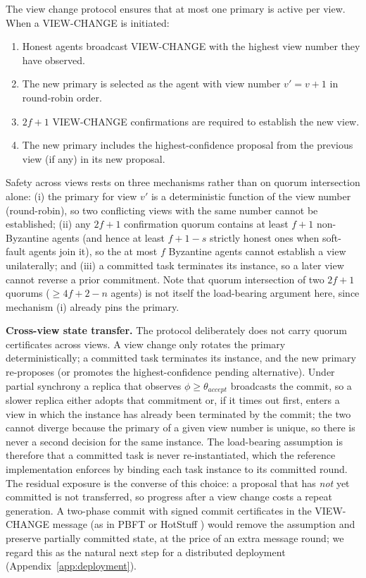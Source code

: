 \documentclass{article}
\begin{document}
The view change protocol ensures that at most one primary is active per view. When a VIEW-CHANGE is initiated:
\begin{enumerate}
    \item Honest agents broadcast VIEW-CHANGE with the highest view number they have observed.
    \item The new primary is selected as the agent with view number $v' = v + 1$ in round-robin order.
    \item $2f + 1$ VIEW-CHANGE confirmations are required to establish the new view.
    \item The new primary includes the highest-confidence proposal from the previous view (if any) in its new proposal.
\end{enumerate}
Safety across views rests on three mechanisms rather than on quorum intersection alone: (i) the primary for view $v'$ is a deterministic function of the view number (round-robin), so two conflicting views with the same number cannot be established; (ii) any $2f+1$ confirmation quorum contains at least $f+1$ non-Byzantine agents (and hence at least $f{+}1{-}s$ strictly honest ones when soft-fault agents join it), so the at most $f$ Byzantine agents cannot establish a view unilaterally; and (iii) a committed task terminates its instance, so a later view cannot reverse a prior commitment. Note that quorum intersection of two $2f{+}1$ quorums ($\geq 4f{+}2{-}n$ agents) is not itself the load-bearing argument here, since mechanism (i) already pins the primary.

\textbf{Cross-view state transfer.} The protocol deliberately does not carry quorum certificates across views. A view change only rotates the primary deterministically; a committed task terminates its instance, and the new primary re-proposes (or promotes the highest-confidence pending alternative). Under partial synchrony a replica that observes $\phi \geq \theta_{accept}$ broadcasts the commit, so a slower replica either adopts that commitment or, if it times out first, enters a view in which the instance has already been terminated by the commit; the two cannot diverge because the primary of a given view number is unique, so there is never a second decision for the same instance. The load-bearing assumption is therefore that a committed task is never re-instantiated, which the reference implementation enforces by binding each task instance to its committed round. The residual exposure is the converse of this choice: a proposal that has \emph{not} yet committed is not transferred, so progress after a view change costs a repeat generation. A two-phase commit with signed commit certificates in the VIEW-CHANGE message (as in PBFT \citep{castro1999practical} or HotStuff \citep{yin2019hotstuff}) would remove the assumption and preserve partially committed state, at the price of an extra message round; we regard this as the natural next step for a distributed deployment (Appendix~\ref{app:deployment}).
\end{document}
